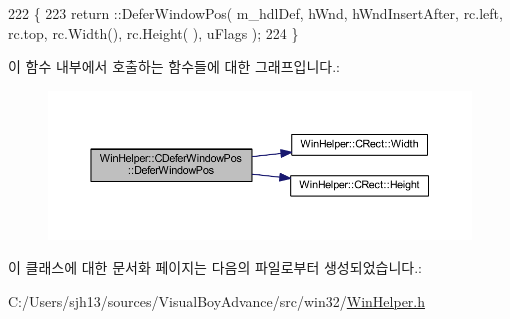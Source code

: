 \begin{DoxyCode}
222         \{
223           return ::DeferWindowPos( m\_hdlDef, hWnd, hWndInsertAfter, rc.left, rc.top, rc.Width(), rc.Height(
      ), uFlags );
224         \}
\end{DoxyCode}
이 함수 내부에서 호출하는 함수들에 대한 그래프입니다.\+:
\nopagebreak
\begin{figure}[H]
\begin{center}
\leavevmode
\includegraphics[width=350pt]{class_win_helper_1_1_c_defer_window_pos_aeba6047e5182577c14bfe4729a602ca9_cgraph}
\end{center}
\end{figure}


이 클래스에 대한 문서화 페이지는 다음의 파일로부터 생성되었습니다.\+:\begin{DoxyCompactItemize}
\item 
C\+:/\+Users/sjh13/sources/\+Visual\+Boy\+Advance/src/win32/\mbox{\hyperlink{_win_helper_8h}{Win\+Helper.\+h}}\end{DoxyCompactItemize}
